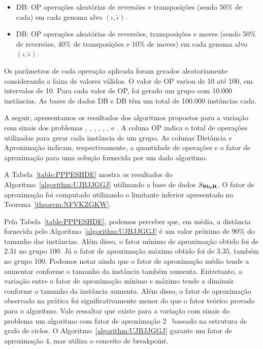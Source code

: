 \begin{itemize}
    \item DB\textsubscript{\SbIRT{}}: OP operações aleatórias de reversões e transposições (sendo 50\% de cada) em cada genoma alvo $(\iota,\breve\iota)$.
    \item DB\textsubscript{\SbIRTM{}}: OP operações aleatórias de reversões, transposições e moves (sendo 50\% de reversões, 40\% de transposições e 10\% de moves) em cada genoma alvo $(\iota,\breve\iota)$.
\end{itemize}

Os parâmetros de cada operação aplicada foram gerados aleatoriamente considerando a faixa de valores válidos. O valor de OP variou de 10 até 100, em intervalos de 10. Para cada valor de OP, foi gerado um grupo com 10.000 instâncias. As bases de dados DB\textsubscript{\SbIRT{}} e DB\textsubscript{\SbIRTM{}} têm um total de 100.000 instâncias cada.

A seguir, apresentamos os resultados dos algoritmos propostos para a variação com sinais dos problemas \SbIR{}, \SbIRI{}, \SbIRM{}, \SbIRMI{}, \SbIRT{}, \SbIRTI{}, \SbIRTM{} e \SbIRTMI{}. A coluna OP indica o total de operações utilizadas para gerar cada instância de um grupo. As colunas Distância e Aproximação indicam, respectivamente, a quantidade de operações e o fator de aproximação para uma solução fornecida por um dado algoritmo.

A Tabela~\ref{table:PPPESHDE} mostra os resultados do Algoritmo~\ref{algorithm:UJBJJGGJ} utilizando a base de dados $S_{\textbf{Sb\textsubscript{I}R}}{}$. O fator de aproximação foi computado utilizando o limitante inferior apresentado no Teorema~\ref{theorem:NFVKZGKW}.



Pela Tabela~\ref{table:PPPESHDE}, podemos perceber que, em média, a distância fornecida pelo Algoritmo~\ref{algorithm:UJBJJGGJ} é um valor próximo de 90\% do tamanho das instâncias. Além disso, o fator mínimo de aproximação obtido foi de $2.31$ no grupo 100. Já o fator de aproximação máximo obtido foi de $3.35$, também no grupo 100. Podemos notar ainda que o fator de aproximação médio tende a aumentar conforme o tamanho da instância também aumenta. Entretanto, a variação entre o fator de aproximação mínimo e máximo tende a diminuir conforme o tamanho da instância aumenta. Além disso, o fator de aproximação observado na prática foi significativamente menor do que o fator teórico provado para o algoritmo. Vale ressaltar que existe para a variação com sinais do problema \SbIR{} um algoritmo com fator de aproximação $2$~\cite{2021b-oliveira-etal} baseado na estrutura de grafo de ciclos. O Algoritmo~\ref{algorithm:UJBJJGGJ} garante um fator de aproximação $4$, mas utiliza o conceito de breakpoint.

